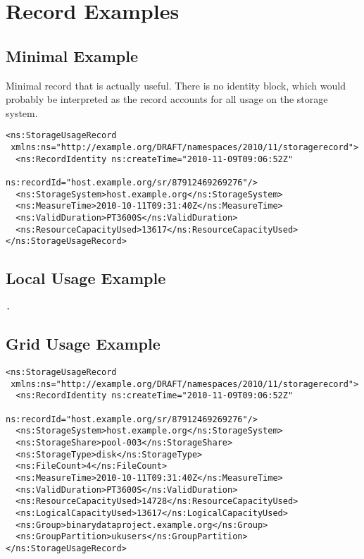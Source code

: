 
\section{Record Examples}
\label{sec:record-examples}


\subsection{Minimal Example}

Minimal record that is actually useful. There is no identity block, which would
probably be interpreted as the record accounts for all usage on the storage
system.

\begin{verbatim}
<ns:StorageUsageRecord
 xmlns:ns="http://example.org/DRAFT/namespaces/2010/11/storagerecord">
  <ns:RecordIdentity ns:createTime="2010-11-09T09:06:52Z"
                     ns:recordId="host.example.org/sr/87912469269276"/>
  <ns:StorageSystem>host.example.org</ns:StorageSystem>
  <ns:MeasureTime>2010-10-11T09:31:40Z</ns:MeasureTime>
  <ns:ValidDuration>PT3600S</ns:ValidDuration>
  <ns:ResourceCapacityUsed>13617</ns:ResourceCapacityUsed>
</ns:StorageUsageRecord>
\end{verbatim}


\subsection{Local Usage Example}


\begin{verbatim}
.
\end{verbatim}



\subsection{Grid Usage Example}

\begin{verbatim}
<ns:StorageUsageRecord
 xmlns:ns="http://example.org/DRAFT/namespaces/2010/11/storagerecord">
  <ns:RecordIdentity ns:createTime="2010-11-09T09:06:52Z"
                     ns:recordId="host.example.org/sr/87912469269276"/>
  <ns:StorageSystem>host.example.org</ns:StorageSystem>
  <ns:StorageShare>pool-003</ns:StorageShare>
  <ns:StorageType>disk</ns:StorageType>
  <ns:FileCount>4</ns:FileCount>
  <ns:MeasureTime>2010-10-11T09:31:40Z</ns:MeasureTime>
  <ns:ValidDuration>PT3600S</ns:ValidDuration>
  <ns:ResourceCapacityUsed>14728</ns:ResourceCapacityUsed>
  <ns:LogicalCapacityUsed>13617</ns:LogicalCapacityUsed>
  <ns:Group>binarydataproject.example.org</ns:Group>
  <ns:GroupPartition>ukusers</ns:GroupPartition>
</ns:StorageUsageRecord>
\end{verbatim}


